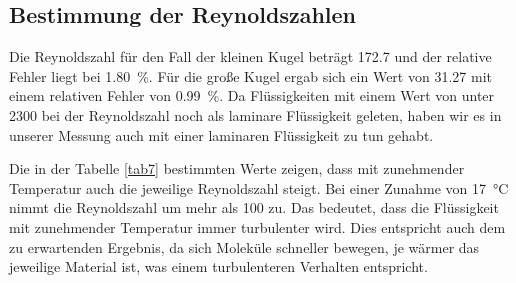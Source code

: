 \subsection{Bestimmung der Reynoldszahlen}
Die Reynoldszahl für den Fall der kleinen Kugel beträgt \num{172.7} und der relative Fehler liegt bei 
\SI{1.80}{\percent}. Für die große Kugel ergab sich ein Wert von \num{31.27} mit einem relativen Fehler von 
\SI{0.99}{\percent}. Da Flüssigkeiten mit einem Wert von unter \num{2300} bei der Reynoldszahl noch als laminare 
Flüssigkeit geleten, haben wir es in unserer Messung auch mit einer laminaren Flüssigkeit zu tun gehabt. 

\noindent Die in der Tabelle \ref{tab7} bestimmten Werte zeigen, dass mit zunehmender Temperatur auch die jeweilige 
Reynoldszahl steigt. Bei einer Zunahme von \SI{17}{\degreeCelsius} nimmt die Reynoldszahl um mehr als \num{100} zu. 
Das bedeutet, dass die Flüssigkeit mit zunehmender Temperatur immer turbulenter wird. Dies entspricht auch dem zu 
erwartenden Ergebnis, da sich Moleküle schneller bewegen, je wärmer das jeweilige Material ist, was einem 
turbulenteren Verhalten entspricht.
